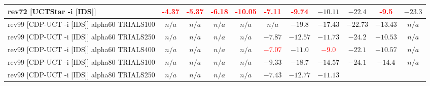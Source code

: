 \documentclass{article}
\begin{document}
\begin{tabular}{|l|r@{$\pm$}rr@{$\pm$}rr@{$\pm$}rr@{$\pm$}rr@{$\pm$}rr@{$\pm$}rr@{$\pm$}rr@{$\pm$}rr@{$\pm$}rr@{$\pm$}r|}
rev72 [UCTStar -i [IDS]]
& \multicolumn{2}{c}{\textbf{\textcolor{red}{-4.37}}}
& \multicolumn{2}{c}{\textbf{\textcolor{red}{-5.37}}}
& \multicolumn{2}{c}{\textbf{\textcolor{red}{-6.18}}}
& \multicolumn{2}{c}{\textbf{\textcolor{red}{-10.05}}}
& \multicolumn{2}{c}{\textbf{\textcolor{red}{-7.11}}}
& \multicolumn{2}{c}{\textbf{\textcolor{red}{-9.74}}}
& \multicolumn{2}{c}{$-10.11$}
& \multicolumn{2}{c}{$-22.4$}
& \multicolumn{2}{c}{\textbf{\textcolor{red}{-9.5}}}
& \multicolumn{2}{c|}{$-23.3$}
\\
\hline
rev99 [CDP-UCT -i [IDS]] alpha60 TRIALS100
& \multicolumn{2}{c}{\textbf{$n/a$}}
& \multicolumn{2}{c}{\textbf{$n/a$}}
& \multicolumn{2}{c}{\textbf{$n/a$}}
& \multicolumn{2}{c}{\textbf{$n/a$}}
& \multicolumn{2}{c}{\textbf{$n/a$}}
& \multicolumn{2}{c}{$-19.8$}
& \multicolumn{2}{c}{$-17.43$}
& \multicolumn{2}{c}{$-22.73$}
& \multicolumn{2}{c}{$-13.43$}
& \multicolumn{2}{c|}{\textbf{$n/a$}}
\\
rev99 [CDP-UCT -i [IDS]] alpha60 TRIALS250
& \multicolumn{2}{c}{\textbf{$n/a$}}
& \multicolumn{2}{c}{\textbf{$n/a$}}
& \multicolumn{2}{c}{\textbf{$n/a$}}
& \multicolumn{2}{c}{\textbf{$n/a$}}
& \multicolumn{2}{c}{\textbf{$-7.87$}}
& \multicolumn{2}{c}{$-12.57$}
& \multicolumn{2}{c}{$-11.73$}
& \multicolumn{2}{c}{$-24.2$}
& \multicolumn{2}{c}{\textbf{$-10.53$}}
& \multicolumn{2}{c|}{\textbf{$n/a$}}
\\
rev99 [CDP-UCT -i [IDS]] alpha60 TRIALS400
& \multicolumn{2}{c}{\textbf{$n/a$}}
& \multicolumn{2}{c}{\textbf{$n/a$}}
& \multicolumn{2}{c}{\textbf{$n/a$}}
& \multicolumn{2}{c}{\textbf{$n/a$}}
& \multicolumn{2}{c}{\textbf{\textcolor{red}{$-7.07$}}}
& \multicolumn{2}{c}{\textbf{$-11.0$}}
& \multicolumn{2}{c}{\textbf{\textcolor{red}{$-9.0$}}}
& \multicolumn{2}{c}{$-22.1$}
& \multicolumn{2}{c}{\textbf{$-10.57$}}
& \multicolumn{2}{c|}{\textbf{$n/a$}}
\\
rev99 [CDP-UCT -i [IDS]] alpha80 TRIALS100
& \multicolumn{2}{c}{\textbf{$n/a$}}
& \multicolumn{2}{c}{\textbf{$n/a$}}
& \multicolumn{2}{c}{\textbf{$n/a$}}
& \multicolumn{2}{c}{\textbf{$n/a$}}
& \multicolumn{2}{c}{$-9.33$}
& \multicolumn{2}{c}{$-18.7$}
& \multicolumn{2}{c}{$-14.57$}
& \multicolumn{2}{c}{$-24.1$}
& \multicolumn{2}{c}{$-14.4$}
& \multicolumn{2}{c|}{\textbf{$n/a$}}
\\
rev99 [CDP-UCT -i [IDS]] alpha80 TRIALS250
& \multicolumn{2}{c}{\textbf{$n/a$}}
& \multicolumn{2}{c}{\textbf{$n/a$}}
& \multicolumn{2}{c}{\textbf{$n/a$}}
& \multicolumn{2}{c}{\textbf{$n/a$}}
& \multicolumn{2}{c}{\textbf{$-7.43$}}
& \multicolumn{2}{c}{$-12.77$}
& \multicolumn{2}{c}{$-11.13$}

\end{tabular}
\end{document}
